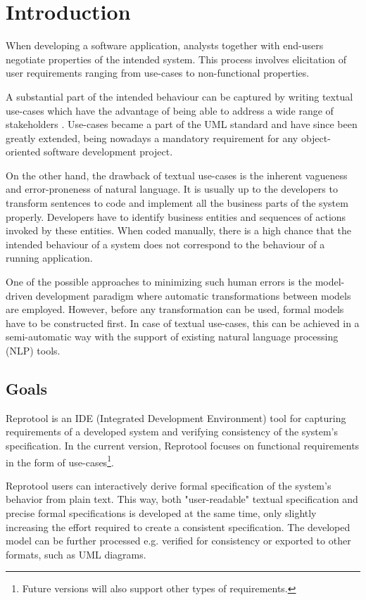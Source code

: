 \section{Introduction}

When developing a software application, analysts together with end-users negotiate properties of the intended system. This process involves elicitation of user requirements ranging from use-cases to non-functional properties.

A substantial part of the intended behaviour can be captured by writing textual use-cases which have the advantage of being able to address a wide range of stakeholders \cite{Larman,Cockburn:2000:WEU:517669}. Use-cases became a part of the UML standard \cite{UML-standard} and have since been greatly extended, being nowadays a mandatory requirement for any object-oriented software development project.

On the other hand, the drawback of textual use-cases is the inherent vagueness and error-proneness of natural language. It is usually up to the developers to transform sentences to code and implement all the business parts of the system properly. Developers have to identify business entities and sequences of actions invoked by these entities. When coded manually, there is a high chance that the intended behaviour of a system does not correspond to the behaviour of a running application.

One of the possible approaches to minimizing such human errors is the model-driven development paradigm \cite{MDD} where automatic transformations between models are employed. However, before any transformation can be used, formal models have to be constructed first. In case of textual use-cases, this can be achieved in a semi-automatic way with the support of existing natural language processing (NLP) tools.

\subsection{Goals}
Reprotool is an IDE (Integrated Development Environment) tool for capturing requirements of a developed system and verifying consistency of the system's specification.
In the current version, Reprotool focuses on functional requirements in the form of use-cases\footnote{Future versions will also support other types of requirements.}.

Reprotool users can interactively derive formal specification of the system's behavior from plain text. This way, both "user-readable" textual specification and precise formal specifications is developed at the same time, only slightly increasing the effort required to create a consistent specification. The developed model can be further processed e.g. verified for consistency or exported to other formats, such as UML diagrams.

